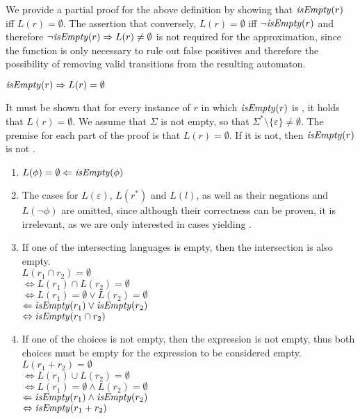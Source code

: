 We provide a partial proof for the above definition by showing that
$\mathit{isEmpty}(r)$ iff $L(r) = \emptyset$. The assertion that conversely, $L(r) =
\emptyset$ iff $\neg\mathit{isEmpty}(r)$ and therefore $\neg\mathit{isEmpty}(r) \Rightarrow L(r)
\neq \emptyset$ is not required for the approximation, since the function is
only necessary to rule out false positives and therefore the possibility of
removing valid transitions from the resulting automaton.

\begin{lem}
   $\mathit{isEmpty}(r) \Rightarrow L(r) = \emptyset$

   It must be shown that for every instance of $r$ in which $\mathit{isEmpty}(r)$ is
   \true, it holds that $L(r) = \emptyset$. We assume that $\Sigma$ is not empty,
   so that $\Sigma^* \setminus \{\varepsilon\} \neq \emptyset$. The premise for
   each part of the proof is that $L(r) = \emptyset$. If it is not, then
   $\mathit{isEmpty}(r)$ is not \true.

   \begin{enumerate}[label=\textbf{(\arabic*)}]
      \item
         $L(\phi) = \emptyset \Leftarrow \mathit{isEmpty}(\phi)$

      \item
         The cases for $L(\varepsilon)$, $L(r^*)$ and $L(l)$, as well as their
         negations and $L(\neg \phi)$ are omitted, since although their
         correctness can be proven, it is irrelevant, as we are only interested
         in cases yielding \true.

      \item
         If one of the intersecting languages is empty, then the intersection is
         also empty. \\
         $L(r_1 \cap r_2) = \emptyset$ \\
         $\Leftrightarrow L(r_1) \cap L(r_2) = \emptyset$ \\
         $\Leftrightarrow L(r_1) = \emptyset \vee L(r_2) = \emptyset$ \\
         $\Leftarrow \mathit{isEmpty}(r_1) \vee \mathit{isEmpty}(r_2)$ \\
         $\Leftrightarrow \mathit{isEmpty}(r_1 \cap r_2)$

      \item
         If one of the choices is not empty, then the expression is not empty,
         thus both choices must be empty for the expression to be considered
         empty. \\
         $L(r_1 + r_2) = \emptyset$ \\
         $\Leftrightarrow L(r_1) \cup L(r_2) = \emptyset$ \\
         $\Leftrightarrow L(r_1) = \emptyset \wedge L(r_2) = \emptyset$ \\
         $\Leftarrow \mathit{isEmpty}(r_1) \wedge \mathit{isEmpty}(r_2)$ \\
         $\Leftrightarrow \mathit{isEmpty}(r_1 + r_2)$


\end{enumerate}
\end{lem}
